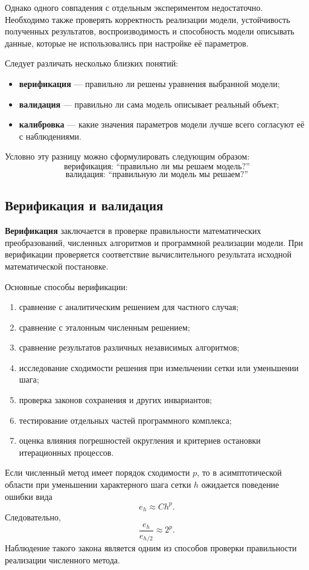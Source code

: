 Однако одного совпадения с отдельным экспериментом недостаточно. Необходимо также проверять корректность реализации модели, устойчивость полученных результатов, воспроизводимость и способность модели описывать данные, которые не использовались при настройке её параметров.

Следует различать несколько близких понятий:
\begin{itemize}
	\item \textbf{верификация} --- правильно ли решены уравнения выбранной модели;
	\item \textbf{валидация} --- правильно ли сама модель описывает реальный объект;
	\item \textbf{калибровка} --- какие значения параметров модели лучше всего согласуют её с наблюдениями.
\end{itemize}

Условно эту разницу можно сформулировать следующим образом:
\[
\boxed{\text{верификация: ``правильно ли мы решаем модель?''}}
\]
\[
\boxed{\text{валидация: ``правильную ли модель мы решаем?''}}
\]

\subsection{Верификация и валидация}

\textbf{Верификация} заключается в проверке правильности математических преобразований, численных алгоритмов и программной реализации модели. При верификации проверяется соответствие вычислительного результата исходной математической постановке.

Основные способы верификации:
\begin{enumerate}
	\item сравнение с аналитическим решением для частного случая;
	\item сравнение с эталонным численным решением;
	\item сравнение результатов различных независимых алгоритмов;
	\item исследование сходимости решения при измельчении сетки или уменьшении шага;
	\item проверка законов сохранения и других инвариантов;
	\item тестирование отдельных частей программного комплекса;
	\item оценка влияния погрешностей округления и критериев остановки итерационных процессов.
\end{enumerate}

Если численный метод имеет порядок сходимости $p$, то в асимптотической области при уменьшении характерного шага сетки $h$ ожидается поведение ошибки вида
\[
e_h\approx Ch^p.
\]
Следовательно,
\[
\frac{e_h}{e_{h/2}}\approx 2^p.
\]
Наблюдение такого закона является одним из способов проверки правильности реализации численного метода.

